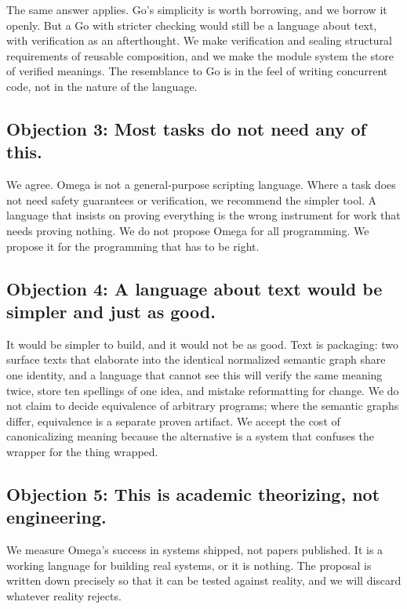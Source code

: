 \documentclass[11pt]{article}
\begin{document}
The same answer applies. Go's simplicity is worth borrowing, and we borrow
it openly. But a Go with stricter checking would still be a language about
text, with verification as an afterthought. We make verification and sealing
structural requirements of reusable composition, and we make the module
system the store of verified meanings. The resemblance to Go is in the feel of writing concurrent code,
not in the nature of the language.

\subsection*{Objection 3: Most tasks do not need any of this.}

We agree. Omega is not a general-purpose scripting language. Where a task
does not need safety guarantees or verification, we recommend the simpler
tool. A language that insists on proving everything is the wrong instrument
for work that needs proving nothing. We do not propose Omega for all
programming. We propose it for the programming that has to be right.

\subsection*{Objection 4: A language about text would be simpler and just as good.}

It would be simpler to build, and it would not be as good. Text is
packaging: two surface texts that elaborate into the identical normalized
semantic graph share one identity, and a language that cannot see this
will verify the same meaning twice, store ten spellings of one idea, and
mistake reformatting for change. We do not claim to decide equivalence of
arbitrary programs; where the semantic graphs differ, equivalence is a
separate proven artifact. We accept the cost of canonicalizing meaning
because the alternative is a system that confuses the wrapper for the
thing wrapped.

\subsection*{Objection 5: This is academic theorizing, not engineering.}

We measure Omega's success in systems shipped, not papers published. It is
a working language for building real systems, or it is nothing. The
proposal is written down precisely so that it can be tested against
reality, and we will discard whatever reality rejects.
\end{document}
